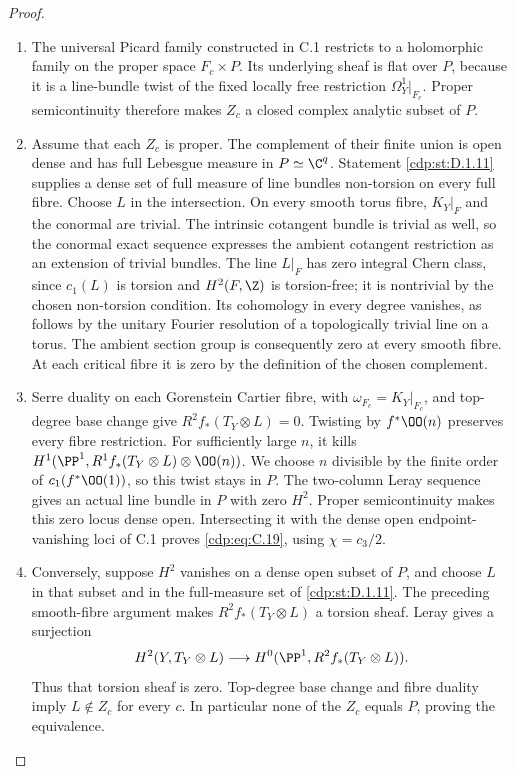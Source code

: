 \begin{proof}

\begin{enumerate}[label={$\langle1\rangle$\arabic*.},leftmargin=*]
\item The universal Picard family constructed in C.1 restricts to a holomorphic family on the proper space $F_c\times P$. Its underlying sheaf is flat over $P$, because it is a line-bundle twist of the fixed locally free restriction $\Omega_Y^1|_{F_c}$. Proper semicontinuity therefore makes $Z_c$ a closed complex analytic subset of $P$.

\item Assume that each $Z_c$ is proper. The complement of their finite union is open dense and has full Lebesgue measure in $P\simeq\C^q$. Statement \ref{cdp:st:D.1.11} supplies a dense set of full measure of line bundles non-torsion on every full fibre. Choose $L$ in the intersection. On every smooth torus fibre, $K_Y|_F$ and the conormal are trivial. The intrinsic cotangent bundle is trivial as well, so the conormal exact sequence expresses the ambient cotangent restriction as an extension of trivial bundles. The line $L|_F$ has zero integral Chern class, since $c_1(L)$ is torsion and $H^2(F,\Z)$ is torsion-free; it is nontrivial by the chosen non-torsion condition. Its cohomology in every degree vanishes, as follows by the unitary Fourier resolution of a topologically trivial line on a torus. The ambient section group is consequently zero at every smooth fibre. At each critical fibre it is zero by the definition of the chosen complement.

\item Serre duality on each Gorenstein Cartier fibre, with $\omega_{F_c}=K_Y|_{F_c}$, and top-degree base change give $R^2f_*(T_Y\otimes L)=0$. Twisting by $f^*\OO(n)$ preserves every fibre restriction. For sufficiently large $n$, it kills $H^1(\PP^1,R^1f_*(T_Y\otimes L)\otimes\OO(n))$. We choose $n$ divisible by the finite order of $c_1(f^*\OO(1))$, so this twist stays in $P$. The two-column Leray sequence gives an actual line bundle in $P$ with zero $H^2$. Proper semicontinuity makes this zero locus dense open. Intersecting it with the dense open endpoint-vanishing loci of C.1 proves \eqref{cdp:eq:C.19}, using $\chi=c_3/2$.

\item Conversely, suppose $H^2$ vanishes on a dense open subset of $P$, and choose $L$ in that subset and in the full-measure set of \ref{cdp:st:D.1.11}. The preceding smooth-fibre argument makes $R^2f_*(T_Y\otimes L)$ a torsion sheaf. Leray gives a surjection
\[
 H^2(Y,T_Y\otimes L)\longrightarrow
 H^0(\PP^1,R^2f_*(T_Y\otimes L)).
\]
Thus that torsion sheaf is zero. Top-degree base change and fibre duality imply $L\notin Z_c$ for every $c$. In particular none of the $Z_c$ equals $P$, proving the equivalence.


\end{enumerate}
\end{proof}
